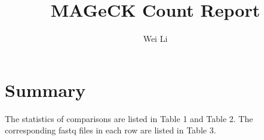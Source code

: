 \documentclass{article}
\begin{document}


\title{MAGeCK Count Report}
\author{Wei Li}

\maketitle


\tableofcontents

\section{Summary}



The statistics of comparisons are listed in Table 1 and Table 2.
The corresponding fastq files in each row are listed in Table 3.
\end{document}
